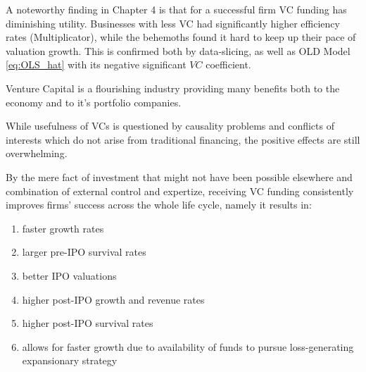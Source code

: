 
A noteworthy finding in Chapter 4 is that for a successful firm VC funding has diminishing utility. Businesses with less VC had significantly higher efficiency rates (Multiplicator), while the behemoths found it hard to keep up their pace of valuation growth. This is confirmed both by data-slicing, as well as OLD Model \ref{eq:OLS_hat} with its negative significant $VC$ coefficient. 

Venture Capital is a flourishing industry providing many benefits both to the economy and to it's portfolio companies.

While usefulness of VCs is questioned by causality problems and conflicts of interests which do not arise from traditional financing, the positive effects are still overwhelming.

By the mere fact of investment that might not have been possible elsewhere and combination of external control and expertize, receiving VC funding consistently improves firms' success across the whole life cycle, namely it results in:
\begin{enumerate}
    \item faster growth rates
    \item larger pre-IPO survival rates
    \item better IPO valuations
    \item higher post-IPO growth and revenue rates
    \item higher post-IPO survival rates
    \item allows for faster growth due to availability of funds to pursue loss-generating expansionary strategy
\end{enumerate}


